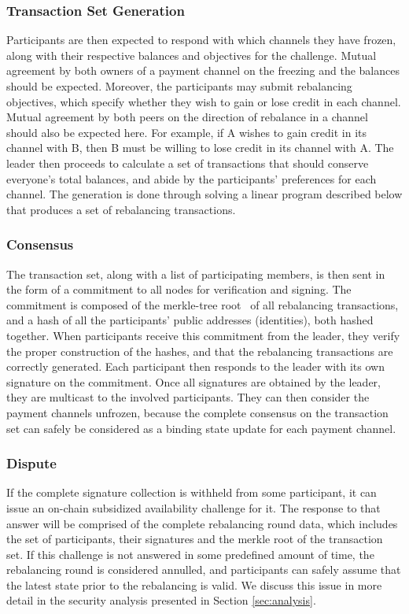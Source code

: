 \documentclass[sigconf]{acmart}
\begin{document}
\subsubsection{Transaction Set Generation}
Participants are then expected to respond with which channels they have frozen, along with their respective balances and objectives for the challenge. Mutual agreement by both owners of a payment channel on the freezing and the balances should be expected.
Moreover, the participants may submit rebalancing objectives, which specify whether they wish to gain or lose credit in each channel. Mutual agreement by both peers on the direction of rebalance in a channel should also be expected here. For example, if A wishes to gain credit in its channel with B, then B must be willing to lose credit in its channel with A.
The leader then proceeds to calculate a set of transactions that should conserve everyone's total balances, and abide by the participants' preferences for each channel. The generation is done through solving a linear program described below that produces a set of rebalancing transactions.

\subsubsection{Consensus}
The transaction set, along with a list of participating members, is then sent in the form of a commitment to all nodes for verification and signing. The commitment is composed of the merkle-tree root~\cite{Merkle1988} of all rebalancing transactions, and a hash of all the participants' public addresses (identities), both hashed together.
When participants receive this commitment from the leader, they verify the proper construction of the hashes, and that the rebalancing transactions are correctly generated. Each participant then responds to the leader with its own signature on the commitment.
Once all signatures are obtained by the leader, they are multicast to the involved participants. They can then consider the payment channels unfrozen, because the complete consensus on the transaction set can safely be considered as a binding state update for each payment channel.

\subsubsection{Dispute}
If the complete signature collection is withheld from some participant, it can issue an on-chain subsidized availability challenge for it. The response to that answer will be comprised of the complete rebalancing round data, which includes the set of participants, their signatures and the merkle root of the transaction set. If this challenge is not answered in some predefined amount of time, the rebalancing round is considered annulled, and participants can safely assume that the latest state prior to the rebalancing is valid. We discuss this issue in more detail in the security analysis presented in Section \ref{sec:analysis}.
\end{document}
